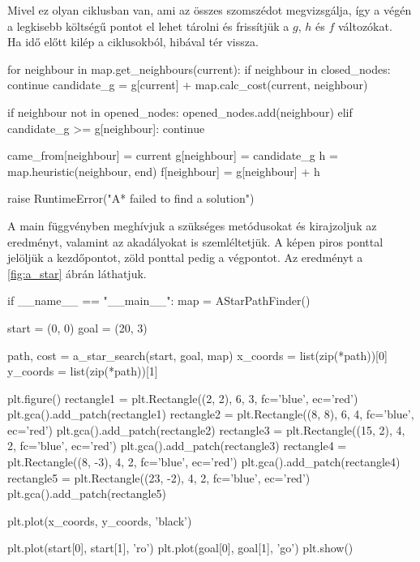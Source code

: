 Mivel ez olyan ciklusban van, ami az összes szomszédot megvizsgálja, így a végén a legkisebb költségű pontot el lehet tárolni és frissítjük a $ g $, $ h $ és $ f $ változókat.\\

Ha idő előtt kilép a ciklusokból, hibával tér vissza.

\begin{python}
	for neighbour in map.get_neighbours(current):
            if neighbour in closed_nodes:
                continue
            candidate_g = g[current] + map.calc_cost(current, neighbour)

            if neighbour not in opened_nodes:
                opened_nodes.add(neighbour)
            elif candidate_g >= g[neighbour]:
                continue

            came_from[neighbour] = current
            g[neighbour] = candidate_g
            h = map.heuristic(neighbour, end)
            f[neighbour] = g[neighbour] + h

    raise RuntimeError("A* failed to find a solution")
\end{python}

\bigskip

A main függvényben meghívjuk a szükséges metódusokat és kirajzoljuk az eredményt, valamint az akadályokat is szemléltetjük. A képen piros ponttal jelöljük a kezdőpontot, zöld ponttal pedig a végpontot. Az eredményt a \ref{fig:a_star} ábrán láthatjuk.

\begin{python}
if __name__ == "__main__":
    map = AStarPathFinder()

    start = (0, 0)
    goal = (20, 3)

    path, cost = a_star_search(start, goal, map)
    x_coords = list(zip(*path))[0]
    y_coords = list(zip(*path))[1]
    
    plt.figure()
    rectangle1 = plt.Rectangle((2, 2), 6, 3, fc='blue', ec='red')
    plt.gca().add_patch(rectangle1)
    rectangle2 = plt.Rectangle((8, 8), 6, 4, fc='blue', ec='red')
    plt.gca().add_patch(rectangle2)
    rectangle3 = plt.Rectangle((15, 2), 4, 2, fc='blue', ec='red')
    plt.gca().add_patch(rectangle3)
    rectangle4 = plt.Rectangle((8, -3), 4, 2, fc='blue', ec='red')
    plt.gca().add_patch(rectangle4)
    rectangle5 = plt.Rectangle((23, -2), 4, 2, fc='blue', ec='red')
    plt.gca().add_patch(rectangle5)
    
    plt.plot(x_coords, y_coords, 'black')

    plt.plot(start[0], start[1], 'ro')
    plt.plot(goal[0], goal[1], 'go')
    plt.show()
\end{python}


